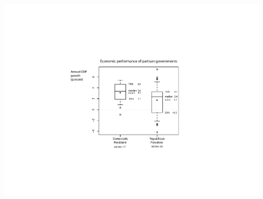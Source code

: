 \documentclass[pdflatex,landscape,titlepage]{foils}
\begin{document}
\begin{center}

\includegraphics[width=9 in]{gdpbox2}

\end{center}
\end{document}

